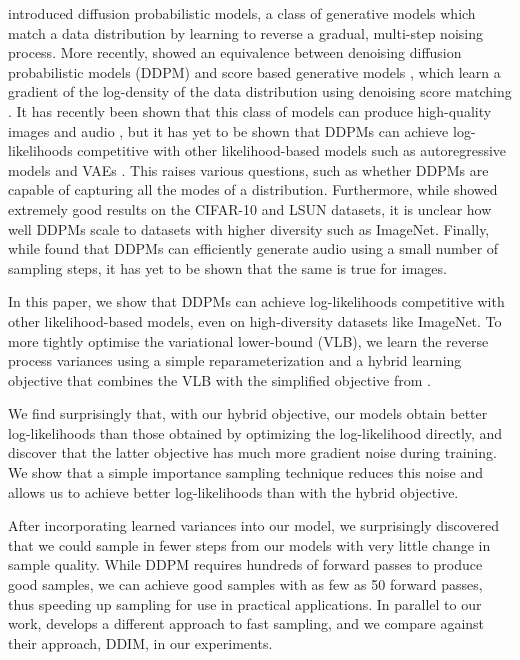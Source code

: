 \documentclass{article}
\begin{document}
\citet{diffusion} introduced diffusion probabilistic models, a class of generative models which match a data distribution by learning to reverse a gradual, multi-step noising process. More recently, \citet{ddpm} showed an equivalence between denoising diffusion probabilistic models (DDPM) and score based generative models \citep{scorematching,improvedscore}, which learn a gradient of the log-density of the data distribution using denoising score matching \citep{hyverianscorematching}. It has recently been shown that this class of models can produce high-quality images \citep{ddpm,improvedscore,adversarial} and audio \citep{wavegrad,diffwave}, but it has yet to be shown that DDPMs can achieve log-likelihoods competitive with other likelihood-based models such as autoregressive models \citep{pixelcnn} and VAEs \citep{vae}. This raises various questions, such as whether DDPMs are capable of capturing all the modes of a distribution. Furthermore, while \citet{ddpm} showed extremely good results on the CIFAR-10 \citep{cifar10} and LSUN \citep{lsun} datasets, it is unclear how well DDPMs scale to datasets with higher diversity such as ImageNet. Finally, while \citet{wavegrad} found that DDPMs can efficiently generate audio using a small number of sampling steps, it has yet to be shown that the same is true for images.

In this paper, we show that DDPMs can achieve log-likelihoods competitive with other likelihood-based models, even on high-diversity datasets like ImageNet. To more tightly optimise the variational lower-bound (VLB), we learn the reverse process variances using a simple reparameterization and a hybrid learning objective that combines the VLB with the simplified objective from \citet{ddpm}.

We find surprisingly that, with our hybrid objective, our models obtain better log-likelihoods than those obtained by optimizing the log-likelihood directly, and discover that the latter objective has much more gradient noise during training. We show that a simple importance sampling technique reduces this noise and allows us to achieve better log-likelihoods than with the hybrid objective.

After incorporating learned variances into our model, we surprisingly discovered that we could sample in fewer steps from our models with very little change in sample quality. While DDPM \citep{ddpm} requires hundreds of forward passes to produce good samples, we can achieve good samples with as few as 50 forward passes, thus speeding up sampling for use in practical applications. In parallel to our work, \citet{ddim} develops a different approach to fast sampling, and we compare against their approach, DDIM, in our experiments.
\end{document}
